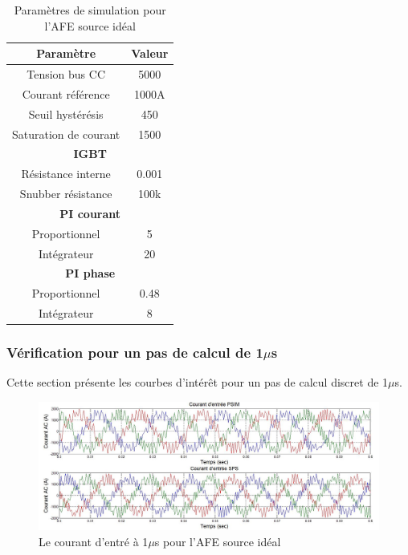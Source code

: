 \documentclass[11pt,letterpaper,final]{report}
\begin{document}
\begin{table}[htb]
\centering
\begin{tabular}{|c|c|} 
  \hline
  Paramètre & Valeur  \\
  \hline\hline
  Tension bus CC & 5000\\ \hline
  Courant référence & 1000A\\ \hline
  Seuil hystérésis & 450\\ \hline
  Saturation de courant& 1500 \\ \hline \hline
  \multicolumn{2}{|c|}{\textbf{IGBT}}\\ \hline
  Résistance interne & 0.001\\
  Snubber résistance & 100k\\ \hline \hline
   \multicolumn{2}{|c|}{\textbf{PI courant}}\\ \hline
  Proportionnel & 5 \\
  Intégrateur & 20 \\ \hline \hline
  \multicolumn{2}{|c|}{\textbf{PI phase}}\\ \hline
  Proportionnel & 0.48 \\
  Intégrateur & 8 \\ \hline \hline
  \hline
\end{tabular}
\caption{Paramètres de simulation pour l'AFE source idéal}
\label{p_AF_ID}
\end{table}

\subsubsection{Vérification pour un pas de calcul de 1$\mu$s}
Cette section présente les courbes d'intérêt pour un pas de calcul discret de 1$\mu$s. 


\begin{figure}[htb]
\centering
\includegraphics[scale=0.5]{Fig/AFEIDEAL/CourantAC.jpg}
\caption{Le courant d'entré à 1$\mu$s pour l'AFE source idéal}
\label{AF_I_cou}
\end{figure}
\end{document}
